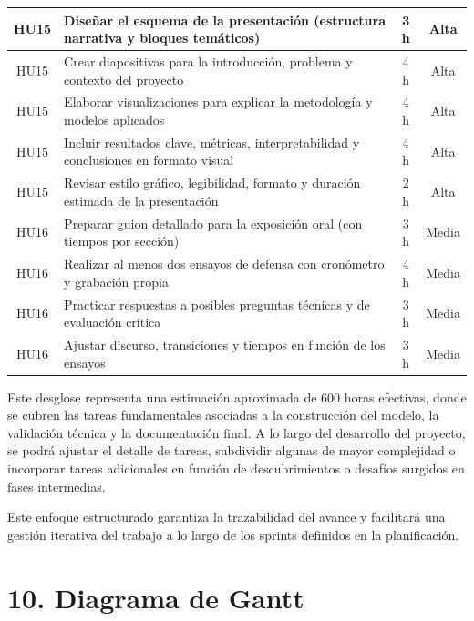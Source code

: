 \documentclass[
11pt, %
]{charter}
\begin{document}
\begin{table}[htpb]
\begin{tabularx}{\linewidth}{@{}|c|X|c|c|@{}}
HU15 & Diseñar el esquema de la presentación (estructura narrativa y bloques temáticos) & 3 h & Alta \\ \hline
HU15 & Crear diapositivas para la introducción, problema y contexto del proyecto & 4 h & Alta \\ \hline
HU15 & Elaborar visualizaciones para explicar la metodología y modelos aplicados & 4 h & Alta \\ \hline
HU15 & Incluir resultados clave, métricas, interpretabilidad y conclusiones en formato visual & 4 h & Alta \\ \hline
HU15 & Revisar estilo gráfico, legibilidad, formato y duración estimada de la presentación & 2 h & Alta \\ \hline

HU16 & Preparar guion detallado para la exposición oral (con tiempos por sección) & 3 h & Media \\ \hline
HU16 & Realizar al menos dos ensayos de defensa con cronómetro y grabación propia & 4 h & Media \\ \hline
HU16 & Practicar respuestas a posibles preguntas técnicas y de evaluación crítica & 3 h & Media \\ \hline
HU16 & Ajustar discurso, transiciones y tiempos en función de los ensayos & 3 h & Media \\ \hline

\end{tabularx}
\end{table}

Este desglose representa una estimación aproximada de 600 horas efectivas, donde se cubren las tareas fundamentales asociadas a la construcción del modelo, la validación técnica y la documentación final. A lo largo del desarrollo del proyecto, se podrá ajustar el detalle de tareas, subdividir algunas de mayor complejidad o incorporar tareas adicionales en función de descubrimientos o desafíos surgidos en fases intermedias.

Este enfoque estructurado garantiza la trazabilidad del avance y facilitará una gestión iterativa del trabajo a lo largo de los sprints definidos en la planificación.

\section{10. Diagrama de Gantt}
\label{sec:gantt}
\end{document}
